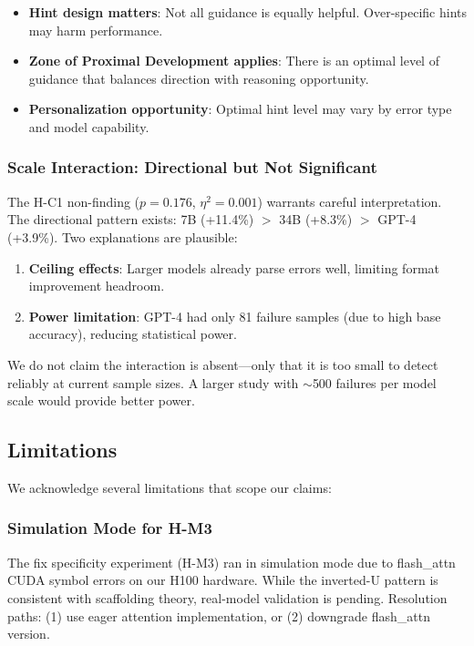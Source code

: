 \begin{itemize}
    \item \textbf{Hint design matters}: Not all guidance is equally helpful. Over-specific hints may harm performance.
    \item \textbf{Zone of Proximal Development applies}: There is an optimal level of guidance that balances direction with reasoning opportunity.
    \item \textbf{Personalization opportunity}: Optimal hint level may vary by error type and model capability.
\end{itemize}

\subsubsection{Scale Interaction: Directional but Not Significant}

The H-C1 non-finding ($p = 0.176$, $\eta^2 = 0.001$) warrants careful interpretation. The directional pattern exists: 7B (+11.4\%) $>$ 34B (+8.3\%) $>$ GPT-4 (+3.9\%). Two explanations are plausible:

\begin{enumerate}
    \item \textbf{Ceiling effects}: Larger models already parse errors well, limiting format improvement headroom.
    \item \textbf{Power limitation}: GPT-4 had only 81 failure samples (due to high base accuracy), reducing statistical power.
\end{enumerate}

We do not claim the interaction is absent---only that it is too small to detect reliably at current sample sizes. A larger study with $\sim$500 failures per model scale would provide better power.

\subsection{Limitations}

We acknowledge several limitations that scope our claims:

\subsubsection{Simulation Mode for H-M3}

The fix specificity experiment (H-M3) ran in simulation mode due to flash\_attn CUDA symbol errors on our H100 hardware. While the inverted-U pattern is consistent with scaffolding theory, real-model validation is pending. Resolution paths: (1) use eager attention implementation, or (2) downgrade flash\_attn version.

